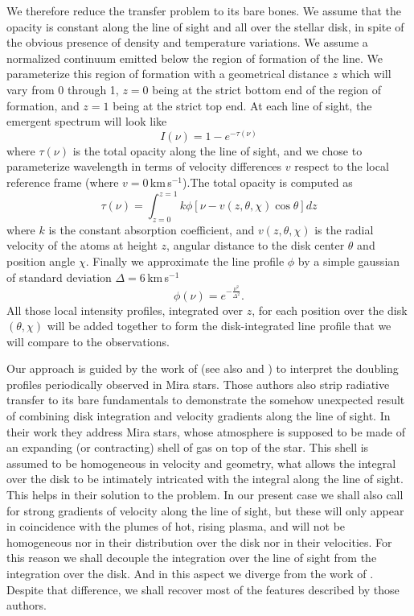 \documentclass{/Users/art2/TeX/aanda/aa}
\def\kms {km\,s$^{-1}$}
\begin{document}
We therefore reduce the transfer problem to its bare bones. We assume that the opacity is constant along the line of sight and all over the stellar 
disk, in spite of the obvious presence of density and temperature variations. We assume a normalized continuum emitted below the region of 
formation of the line. We parameterize this region of formation with a geometrical distance $z$ which will vary from 0 through 1, $z=0$ being at 
the strict bottom end of the region of formation, and $z=1$ being at the strict top end. At each line of sight, the emergent spectrum will look like
\begin{equation}
   I(\nu)=1-e^{-\tau(\nu)}
\end{equation}
where $\tau(\nu)$ is the total opacity along the line of sight, and we chose to parameterize wavelength in terms of velocity differences $v$ respect 
to the local reference frame (where $v=0$\,\kms).The total opacity is computed as 
\begin{equation}
   \tau(\nu)=\int_{z=0}^{z=1} k \phi[\nu-v(z,\theta,\chi )\cos \theta]dz
   \label{opacityintegral}
\end{equation}
where $k$ is the constant absorption coefficient, and $v(z,\theta,\chi)$ is the radial velocity of the atoms at height $z$, angular distance to the
disk center  $\theta$ and position angle $\chi$. Finally we approximate the line profile $\phi$ by a simple gaussian of standard deviation $\Delta=6$\,\kms \citep{lopez_ariste_convective_2018}
\begin{equation}
   \phi(\nu)= e^{-\frac{\nu^2}{\Delta^2}}.
\end{equation}
All those local intensity profiles, integrated over $z$, for each position over the disk $(\theta,\chi)$ will be added together to form the 
disk-integrated line profile that we will compare to the observations.

Our approach is guided by the work of \cite{bertout_line_1987} (see also \cite{wagenblast_spectral_1983} and \cite{chandrasekhar_formation_1945}) to interpret the doubling profiles periodically observed in Mira 
stars. Those authors also strip radiative transfer to its bare fundamentals to demonstrate the somehow unexpected result of combining disk integration 
and velocity gradients along the line of sight. In their work they address Mira stars, whose atmosphere is supposed to be made of an expanding (or contracting)
shell of gas on top of the star. This shell is assumed to be homogeneous in velocity and geometry, what allows the integral over the disk to be 
intimately intricated with the integral along the line of sight. This helps in their solution to the problem. In our present case we shall also call 
for strong gradients of velocity along the line of sight, but these will only appear in coincidence with the plumes of hot, rising plasma, and will not be 
homogeneous nor in their distribution over the disk nor in their velocities. For this reason we shall decouple the integration over the line 
of sight from the integration over the disk. And in this aspect we diverge from the work of \cite{bertout_line_1987}. Despite that difference, we shall recover most 
of the features described by those authors.
\end{document}
